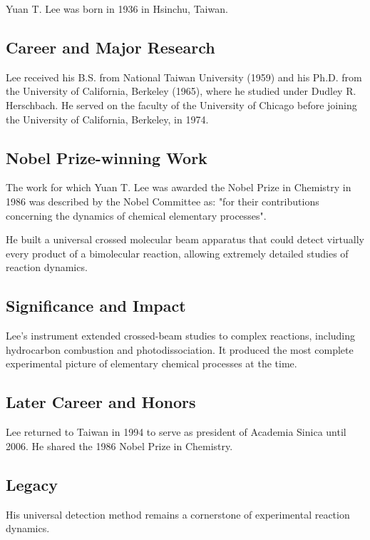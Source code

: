 Yuan T. Lee was born in 1936 in Hsinchu, Taiwan.

\subsection*{Career and Major Research}

Lee received his B.S. from National Taiwan University (1959) and his Ph.D. from the University of California, Berkeley (1965), where he studied under Dudley R. Herschbach. He served on the faculty of the University of Chicago before joining the University of California, Berkeley, in 1974.

\subsection*{Nobel Prize-winning Work}

The work for which Yuan T. Lee was awarded the Nobel Prize in Chemistry in 1986 was described by the Nobel Committee as: "for their contributions concerning the dynamics of chemical elementary processes".

He built a universal crossed molecular beam apparatus that could detect virtually every product of a bimolecular reaction, allowing extremely detailed studies of reaction dynamics.

\subsection*{Significance and Impact}

Lee's instrument extended crossed-beam studies to complex reactions, including hydrocarbon combustion and photodissociation. It produced the most complete experimental picture of elementary chemical processes at the time.

\subsection*{Later Career and Honors}

Lee returned to Taiwan in 1994 to serve as president of Academia Sinica until 2006. He shared the 1986 Nobel Prize in Chemistry.

\subsection*{Legacy}

His universal detection method remains a cornerstone of experimental reaction dynamics.

